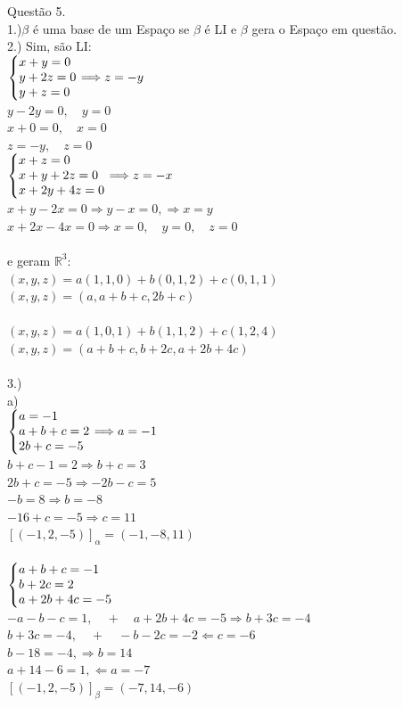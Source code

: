 \documentclass[12pt]{article}
\begin{document}
Questão 5.\\
1.)$\beta$ é uma base de um Espaço se $\beta$ é LI e $\beta$ gera o Espaço em questão.\\
2.) Sim, são LI:\\
$\left\{\begin{array}{@{}l@{}}
	x+y=0\\
	y+2z=0\\
	y+z=0
\end{array}\right. \Longrightarrow z = -y$\\
$y-2y=0,\quad y=0$\\
$x+0=0,\quad x=0$\\
$z=-y,\quad z=0$\\
$\left\{\begin{array}{@{}l@{}}
	x+z=0\\
	x+y+2z=0\\
	x+2y+4z=0
\end{array}\right. \Longrightarrow z=-x$\\
$x+y-2x=0 \Longrightarrow y-x=0, \Longrightarrow x=y$\\
$x+2x-4x=0 \Longrightarrow x=0, \quad y=0, \quad z=0$\\\\
e geram $\mathds{R}^{3}$:\\
$(x,y,z)=a(1,1,0)+b(0,1,2)+c(0,1,1)$\\
$(x,y,z)=(a, a+b+c, 2b+c)$\\\\
$(x,y,z)=a(1,0,1)+b(1,1,2)+c(1,2,4)$\\
$(x,y,z)=(a+b+c, b+2c, a+2b+4c)$\\\\
3.)\\
a)\\
$\left\{\begin{array}{@{}l@{}}
	a=-1\\
	a+b+c=2\\
	2b+c=-5
\end{array}\right. \Longrightarrow a=-1$\\
$b+c-1=2 \Longrightarrow b+c=3$\\
$2b+c=-5 \Longrightarrow -2b-c=5$\\
$-b=8 \Longrightarrow b=-8$\\
$-16+c=-5 \Longrightarrow c =11$\\
$ [(-1,2,-5)]_{\alpha} = (-1,-8,11)$\\\\
$\left\{\begin{array}{@{}l@{}}
	a+b+c=-1\\
	b+2c=2\\
	a+2b+4c=-5
\end{array}\right.$\\
$-a-b-c=1,\quad + \quad a+2b+4c=-5 \Longrightarrow b+3c=-4$\\
$b+3c=-4,\quad + \quad -b-2c=-2 \Longleftarrow c=-6$\\
$b-18=-4, \Longrightarrow b = 14$\\
$a+14-6=1, \Longleftarrow a = -7$\\
$[(-1,2,-5)]_{\beta} = (-7,14,-6)$\\
\end{document}
